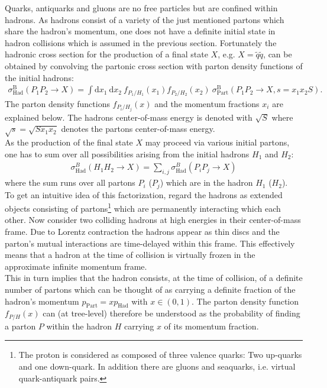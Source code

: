 Quarks, antiquarks and gluons are no free particles but are confined within hadrons. As hadrons consist of a variety of the just mentioned partons which share the hadron's momentum, one does not have a definite initial state in hadron collisions which is assumed in the previous section. Fortunately the hadronic cross section for the production of a final state $X$, e.g. $X = \tilde{q} \tilde{q}$, can be obtained by convolving the partonic cross section with parton density functions of the initial hadrons:
\begin{align}
\sigma^\mathrm{B}_{\mathrm{Had}}(P_1 P_2 \to X) = \int \mbox{d}x_1\  \mbox{d}x_2\ f_{P_1/H_1}(x_1) f_{P_2/H_2}(x_2)\ \sigma^\mathrm{B}_{\mathrm{Part}} (P_1 P_2 \to X, s = x_ 1x_2 S).\label{eq:facTheorem}
\end{align}
The parton density functions $f_{P_i/H_j}(x)$ and the momentum fractions $x_i$ are explained below. The hadrons center-of-mass energy is denoted with $\sqrt{S}$ where $\sqrt{s} = \sqrt{S x_1 x_2}$ denotes the partons center-of-mass energy.\\
As the production of the final state $X$ may proceed via various initial partons, one has to sum over all possibilities arising from the initial hadrons $H_1$ and $H_2$:
\begin{align}
\sigma^B_{\mathrm{Had}}(H_1 H_2 \to X) = \sum_{i,j} \sigma^B_{\mathrm{Had}}(P_i P_j \to X)
\end{align}
where the sum runs over all partons $P_i$ ($P_j$) which are in the hadron $H_1$ ($H_2$).\\
To get an intuitive idea of this factorization, regard the hadrons as extended objects consisting of partons\footnote{The proton is considered as composed of three valence quarks: Two up-quarks and one down-quark. In addition there are gluons and seaquarks, i.e. virtual quark-antiquark pairs.} which are permanently interacting which each other. Now consider two colliding hadrons at high energies in their center-of-mass frame. Due to Lorentz contraction the hadrons appear as thin discs and the parton's mutual interactions are time-delayed within this frame. This effectively means that a hadron at the time of collision is virtually frozen in the approximate infinite momentum frame.\\ %
This in turn implies that the hadron consists, at the time of collision, of a definite number of partons which can be thought of as carrying a definite fraction of the hadron's  momentum $p_{\mathrm{Part}} = x p_{\mathrm{Had}}$ with $x \in \left(0, 1 \right)$. The parton density function $f_{P/H}(x)$ can (at tree-level) therefore be understood as the probability of finding a parton $P$ within the hadron $H$ carrying $x$ of its momentum fraction. 
